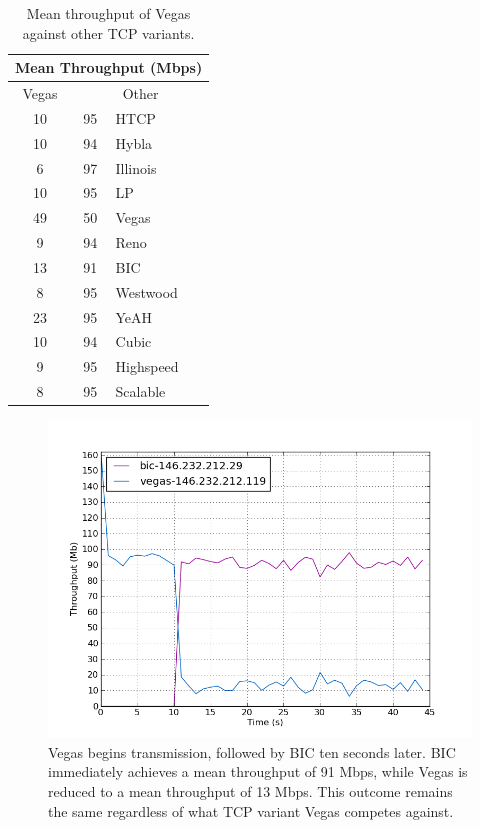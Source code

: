 \documentclass[11pt,a4paper,twocolumn]{article}
\begin{document}
\begin{table}[h!]
	\begin{center}
		\begin{tabular}{| c | c | l |}
    			\hline
			\multicolumn{3}{|c|}{Mean Throughput (Mbps)} \\
    			\hline
    			Vegas &  \multicolumn{2}{|c|}{Other}  \\
			\hline
    			10 & 95 & HTCP \\
			\hline
    			10 & 94 & Hybla \\
			\hline
    			6 & 97 & Illinois \\
			\hline
    			10 & 95 & LP \\
			\hline
    			49 & 50 & Vegas \\
			\hline
    			9 & 94 & Reno \\
			\hline
    			13 & 91 & BIC \\
			\hline
    			8 & 95 & Westwood \\
			\hline
    			23 & 95 & YeAH \\
			\hline
    			10 & 94 & Cubic \\
			\hline
    			9 & 95 & Highspeed \\
			\hline
    			8 & 95 & Scalable \\
    			\hline
    		\end{tabular}
  	\end{center}
  	\caption{Mean throughput of Vegas against other TCP variants.}
	\label{table:vegas}
\end{table}

\begin{figure}[p]
	\includegraphics[width=\linewidth]{exp44.png}
	\caption{Vegas begins transmission, followed by BIC ten seconds later. BIC immediately achieves a mean throughput of
		91 Mbps, while Vegas is reduced to a mean throughput of 13 Mbps. This outcome remains the same
regardless of what TCP variant Vegas competes against.}
	\label{fig:vegas_reno}
\end{figure}
\end{document}
